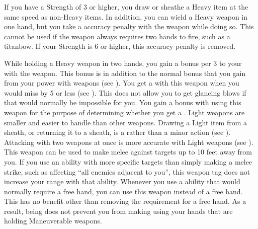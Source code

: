     If you have a Strength of 3 or higher, you draw or sheathe a Heavy item at the same speed as non-Heavy items.
    In addition, you can wield a Heavy weapon in one hand, but you take a  accuracy penalty with the weapon while doing so.
    This cannot be used if the weapon always requires two hands to fire, such as a titanbow.
    If your Strength is 6 or higher, this accuracy penalty is removed.

    While holding a Heavy weapon in two hands, you gain a  bonus per 3  to your  with the weapon.
    This bonus is in addition to the normal bonus that you gain from your power with weapons (see ).
     You get a  with this weapon when you would miss by 5 or less (see ).
    This does not allow you to get glancing blows if that would normally be impossible for you.
     You gain a   bonus with  using this weapon for the purpose of determining whether you get a .
     Light weapons are smaller and easier to handle than other weapons.
    Drawing a Light item from a sheath, or returning it to a sheath, is a  rather than a minor action (see ).
    Attacking with two weapons at once is more accurate with Light weapons (see ).
    \label{Long Weapon} This weapon can be used to make melee  against targets up to 10 feet away from you.
    If you use an ability with more specific targets than simply making a melee strike, such as affecting ``all enemies adjacent to you'', this weapon tag does not increase your range with that ability.
     Whenever you use a \atBrawling ability that would normally require a free hand, you can use this weapon instead of a free hand.
    This has no benefit other than removing the requirement for a free hand.
    As a result, being \grappled does not prevent you from making  using your hands that are holding Maneuverable weapons.
